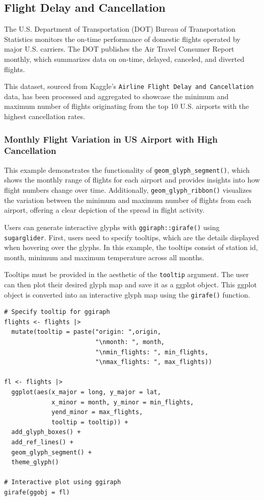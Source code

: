 \hypertarget{flight-delay-and-cancellation}{%
\subsection{Flight Delay and Cancellation}\label{flight-delay-and-cancellation}}

The U.S. Department of Transportation (DOT) Bureau of Transportation Statistics monitors the on-time performance of domestic flights operated by major U.S. carriers. The DOT publishes the Air Travel Consumer Report monthly, which summarizes data on on-time, delayed, canceled, and diverted flights.

This dataset, sourced from Kaggle's \texttt{Airline\ Flight\ Delay\ and\ Cancellation} data, has been processed and aggregated to showcase the minimum and maximum number of flights originating from the top 10 U.S. airports with the highest cancellation rates.

\hypertarget{monthly-flight-variation-in-us-airport-with-high-cancellation}{%
\subsubsection{Monthly Flight Variation in US Airport with High Cancellation}\label{monthly-flight-variation-in-us-airport-with-high-cancellation}}

This example demonstrates the functionality of \texttt{geom\_glyph\_segment()}, which shows the monthly range of flights for each airport and provides insights into how flight numbers change over time. Additionally, \texttt{geom\_glyph\_ribbon()} visualizes the variation between the minimum and maximum number of flights from each airport, offering a clear depiction of the spread in flight activity.

Users can generate interactive glyphs with \texttt{ggiraph::girafe()} using \texttt{sugarglider}. First, users need to specify tooltips, which are the details displayed when hovering over the glyphs. In this example, the tooltips consist of station id, month, minimum and maximum temperature across all months.

Tooltips must be provided in the aesthetic of the \texttt{tooltip} argument. The user can then plot their desired glyph map and save it as a ggplot object. This ggplot object is converted into an interactive glyph map using the \texttt{girafe()} function.

\begin{verbatim}
# Specify tooltip for ggiraph 
flights <- flights |>
  mutate(tooltip = paste("origin: ",origin,
                         "\nmonth: ", month,
                         "\nmin_flights: ", min_flights,
                         "\nmax_flights: ", max_flights))

fl <- flights |> 
  ggplot(aes(x_major = long, y_major = lat,
             x_minor = month, y_minor = min_flights,
             yend_minor = max_flights,
             tooltip = tooltip)) + 
  add_glyph_boxes() +
  add_ref_lines() +
  geom_glyph_segment() +
  theme_glyph()

# Interactive plot using ggiraph
girafe(ggobj = fl)
\end{verbatim}

